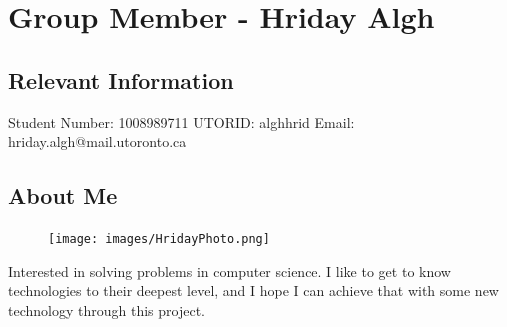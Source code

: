 \documentclass{article}
\begin{document}
\noindent\makebox[\linewidth]{\rule{\paperwidth}{0.4pt}}

\section{Group Member - Hriday Algh}
\subsection{Relevant Information}
    Student Number: 1008989711 \newline
    UTORID: alghhrid \newline
    Email: hriday.algh@mail.utoronto.ca
\subsection{About Me}
\begin{figure}[h]
    \centering
    \texttt{[image: images/HridayPhoto.png]}
\end{figure}
Interested in solving problems in computer science. I like to get to know technologies to their deepest level, and I hope I can achieve that with some new technology through this project.
\end{document}
